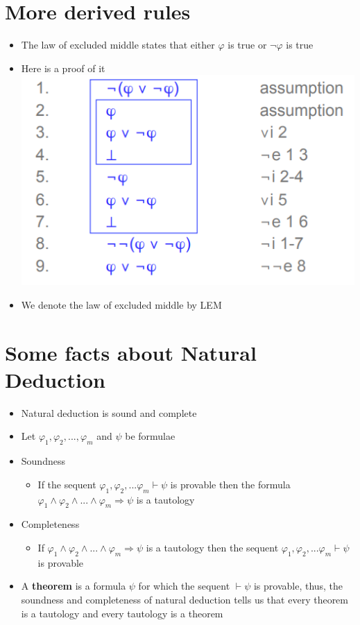 \documentclass{article}[18pt]
\begin{document}
\section{More derived rules}
\begin{itemize}
	\item The law of excluded middle states that either $\varphi$ is true or $\lnot\varphi$ is true
	\item Here is a proof of it\\
	\includegraphics[scale=0.7]{MiddleStates.png}
	\item We denote the law of excluded middle by LEM
\end{itemize}
\section{Some facts about Natural Deduction}
\begin{itemize}
	\item Natural deduction is sound and complete
	\item Let $\varphi_1,\varphi_2,...,\varphi_m$ and $\psi$ be formulae
	\item Soundness
	\begin{itemize}
		\item If the sequent $\varphi_1,\varphi_2,...\varphi_m\vdash\psi$ is provable then the formula $\varphi_1\land\varphi_2\land...\land\varphi_m\Rightarrow\psi$ is a tautology
	\end{itemize}
	\item Completeness
	\begin{itemize}
		\item If $\varphi_1\land\varphi_2\land...\land\varphi_m\Rightarrow\psi$ is a tautology then the sequent $\varphi_1,\varphi_2,...\varphi_m\vdash\psi$ is provable
	\end{itemize} 
	\item A \textbf{theorem} is a formula $\psi$ for which the sequent $\vdash\psi$ is provable, thus, the soundness and completeness of natural deduction tells us that every theorem is a tautology and every tautology is a theorem
\end{itemize}
\end{document}
